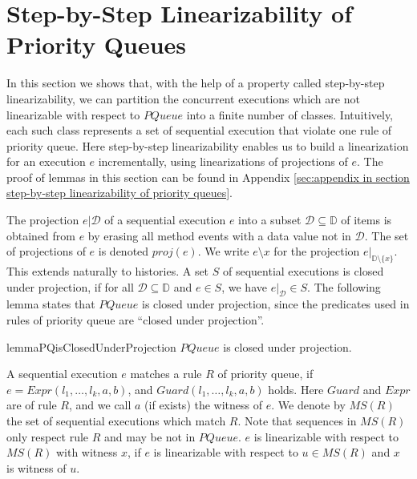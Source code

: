 \section{Step-by-Step Linearizability of Priority Queues}
\label{sec:step-by-step linearizability of priority queues}

In this section we shows that, with the help of a property called step-by-step linearizability, we can partition the concurrent executions which are not linearizable with respect to $\textit{PQueue}$ into a finite number of classes. Intuitively, each such class represents a set of sequential execution that violate one rule of priority queue. Here step-by-step linearizability enables us to build a linearization for an execution $e$ incrementally, using linearizations of projections of $e$. The proof of lemmas in this section can be found in Appendix \ref{sec:appendix in section step-by-step linearizability of priority queues}.

The projection $e \vert{\mathcal{D}}$ of a sequential execution $e$ into a subset $\mathcal{D} \subseteq \mathbb{D}$ of items is obtained from $e$ by erasing all method events with a data value not in $\mathcal{D}$. The set of projections of $e$ is denoted $\textit{proj}(e)$. We write $e \setminus x$ for the projection $e \vert_{ \mathbb{D} \setminus \{ x \} }$. This extends naturally to histories. A set $S$ of sequential executions is closed under projection, if for all $\mathcal{D} \subseteq \mathbb{D}$ and $e \in S$, we have $e \vert_{ \mathcal{D} } \in S$. The following lemma states that $\textit{PQueue}$ is closed under projection, since the predicates used in rules of priority queue are ``closed under projection''.

\begin{restatable}{lemma}{PQisClosedUnderProjection}
\label{lemma:PQ is closed under projection}
$\textit{PQueue}$ is closed under projection.
\end{restatable}

A sequential execution $e$ matches a rule $R$ of priority queue, if $e=\textit{Expr}(l_1, \ldots, l_k,a,b)$, and $\textit{Guard}(l_1, \ldots, l_k,a,b)$ holds. Here $\textit{Guard}$ and $\textit{Expr}$ are of rule $R$, and we call $a$ (if exists) the witness of $e$. We denote by $\textit{MS}(R)$ the set of sequential executions which match $R$. Note that sequences in $\textit{MS}(R)$ only respect rule $R$ and may be not in $\textit{PQueue}$. $e$ is linearizable with respect to $\textit{MS}(R)$ with witness $x$, if $e$ is linearizable with respect to $u \in \textit{MS}(R)$ and $x$ is witness of $u$.

